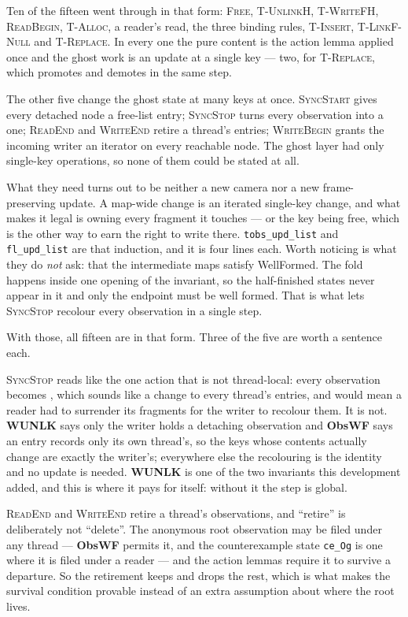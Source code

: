 Ten of the fifteen went through in that form: \textsc{Free},
\textsc{T-UnlinkH}, \textsc{T-WriteFH}, \textsc{ReadBegin}, \textsc{T-Alloc},
a reader's read, the three binding rules, \textsc{T-Insert},
\textsc{T-LinkF-Null} and \textsc{T-Replace}.  In every one the pure content is
the action lemma applied once and the ghost work is an update at a single key
--- two, for \textsc{T-Replace}, which promotes and demotes in the same step.

The other five change the ghost state at many keys at once.  \textsc{SyncStart}
gives every detached node a free-list entry; \textsc{SyncStop} turns every
\unlk{} observation into a \frbl{} one; \textsc{ReadEnd} and \textsc{WriteEnd}
retire a thread's entries; \textsc{WriteBegin} grants the incoming writer an
iterator on every reachable node.  The ghost layer had only single-key
operations, so none of them could be stated at all.

What they need turns out to be neither a new camera nor a new frame-preserving
update.  A map-wide change is an iterated single-key change, and what makes it
legal is owning every fragment it touches --- or the key being free, which is
the other way to earn the right to write there.  \texttt{tobs\_upd\_list} and
\texttt{fl\_upd\_list} are that induction, and it is four lines each.  Worth
noticing is what they do \emph{not} ask: that the intermediate maps satisfy
\textsf{WellFormed}.  The fold happens inside one opening of the invariant, so the
half-finished states never appear in it and only the endpoint must be well
formed.  That is what lets \textsc{SyncStop} recolour every observation in a
single step.

With those, all fifteen are in that form.  Three of the five are worth a
sentence each.

\textsc{SyncStop} reads like the one action that is not thread-local: every
\unlk{} observation becomes \frbl{}, which sounds like a change to every
thread's entries, and would mean a reader had to surrender its fragments for
the writer to recolour them.  It is not.  \textbf{WUNLK} says only the writer
holds a detaching observation and \textbf{ObsWF} says an entry records only its
own thread's, so the keys whose contents actually change are exactly the
writer's; everywhere else the recolouring is the identity and no update is
needed.  \textbf{WUNLK} is one of the two invariants this development added,
and this is where it pays for itself: without it the step is global.

\textsc{ReadEnd} and \textsc{WriteEnd} retire a thread's observations, and
``retire'' is deliberately not ``delete''.  The anonymous root observation may
be filed under any thread --- \textbf{ObsWF} permits it, and the counterexample
state \texttt{ce\_Og} is one where it is filed under a reader --- and the action
lemmas require it to survive a departure.  So the retirement keeps \rt{} and
drops the rest, which is what makes the survival condition provable instead of
an extra assumption about where the root lives.

